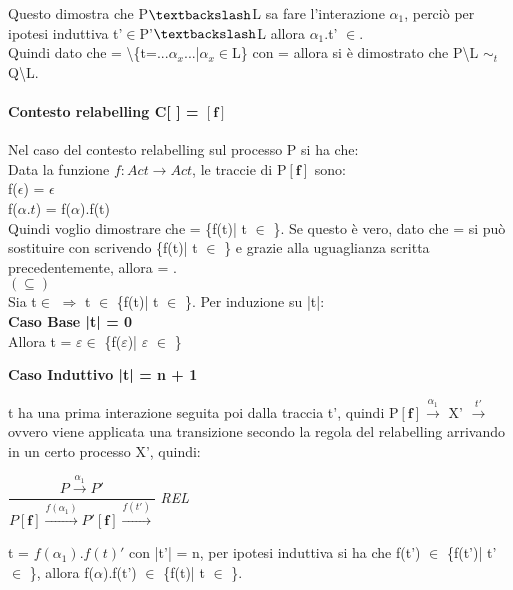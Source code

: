 Questo dimostra che P$\textbackslash$L sa fare l'interazione $\alpha_{1}$, perciò per ipotesi induttiva t'$\in$P'$\textbackslash$L allora $\alpha_{1}$.t' $\in$.
\\

Quindi dato che  = \textbackslash \{t=...$\alpha_{x}$...|$\alpha_{x}\in$L\} con  =   allora si è dimostrato che  P\textbackslash L $\sim_{t}$ Q\textbackslash L.

\paragraph{Contesto relabelling  C[ ] = $\mathbf{[f]}$ } \mbox{}

Nel caso del contesto relabelling sul processo P si ha che:	\\	
Data la funzione $f: Act \rightarrow Act$, le traccie di P$\mathbf{[f]}$ sono:\\
f($\epsilon$) = $\epsilon$\\
f($\alpha.t$) =  f($\alpha$).f(t)\\
Quindi voglio dimostrare che  = \{f(t)| t $\in$ \}. Se questo è vero, dato che  =   si può sostituire  con  scrivendo \{f(t)| t $\in$ \} e grazie alla uguaglianza scritta precedentemente, allora  = . \\

$(\subseteq)$ \\

Sia t$\in$  $\Rightarrow$ t $\in$ \{f(t)| t $\in$ \}. Per induzione su |t|:
\\

\textbf{Caso Base |t| = 0}
\\
Allora t = $\varepsilon \in$ \{f($\varepsilon$)| $\varepsilon$ $\in$ \}

\pagebreak
\textbf{Caso Induttivo |t| = n + 1}

t ha una prima interazione seguita poi dalla traccia t', quindi P$\mathbf{[f]}  \overset{\alpha_{1}}\rightarrow $ X' $\overset{t'}\rightarrow$ ovvero viene applicata una transizione secondo la regola del relabelling arrivando in un certo processo X', quindi:

$\dfrac{P \overset{\alpha_{1}}\rightarrow P'}{P \mathbf{[f]} \overset{f(\alpha_{1})}\rightarrow P'\mathbf{[f]}\overset{f(t')}\rightarrow}$ \textit{REL} 

t = $f(\alpha_{1}).f(t)'$ con |t'| = n, per ipotesi induttiva si ha che f(t') $\in$ \{f(t')| t' $\in$ \}, allora f($\alpha$).f(t') $\in$ \{f(t)| t $\in$ \}.\\

